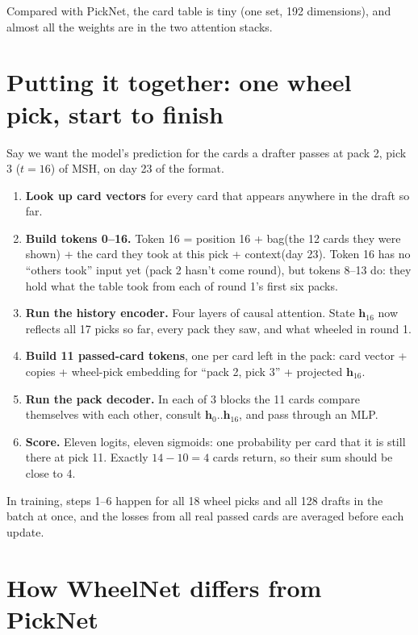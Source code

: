 \documentclass[11pt,letterpaper]{article}
\begin{document}
Compared with PickNet, the card table is tiny (one set, 192 dimensions), and almost all the weights are in the
two attention stacks.

\section{Putting it together: one wheel pick, start to finish}

Say we want the model's prediction for the cards a drafter passes at pack 2, pick 3 ($t=16$) of MSH, on day
23 of the format.

\begin{enumerate}
\item \textbf{Look up card vectors} for every card that appears anywhere in the draft so far.
\item \textbf{Build tokens 0--16.} Token 16 = position 16 + bag(the 12 cards they were shown) + the card they
took at this pick + context(day 23). Token 16 has no ``others took'' input yet (pack 2 hasn't come round), but
tokens 8--13 do: they hold what the table took from each of round 1's first six packs.
\item \textbf{Run the history encoder.} Four layers of causal attention. State $\mathbf{h}_{16}$ now reflects
all 17 picks so far, every pack they saw, and what wheeled in round 1.
\item \textbf{Build 11 passed-card tokens}, one per card left in the pack: card vector + copies + wheel-pick
embedding for ``pack 2, pick 3'' + projected $\mathbf{h}_{16}$.
\item \textbf{Run the pack decoder.} In each of 3 blocks the 11 cards compare themselves with each other,
consult $\mathbf{h}_0..\mathbf{h}_{16}$, and pass through an MLP.
\item \textbf{Score.} Eleven logits, eleven sigmoids: one probability per card that it is still there at pick 11.
Exactly $14-10=4$ cards return, so their sum should be close to 4.
\end{enumerate}

In training, steps 1--6 happen for all 18 wheel picks and all 128 drafts in the batch at once, and the losses
from all real passed cards are averaged before each update.

\section{How WheelNet differs from PickNet}\label{sec:vs}
\end{document}
